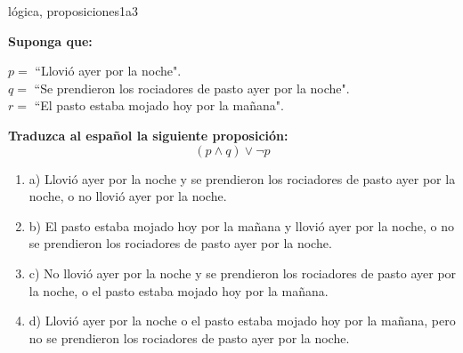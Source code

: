 \documentclass{article}
\begin{document}
\begin{question}{3}{lógica, proposiciones}{1}{a}{3}{
\textbf{Suponga que:} \medskip

\(p = \) ``Llovió ayer por la noche".\\
\(q = \) ``Se prendieron los rociadores de pasto ayer por la noche".\\
\(r = \) ``El pasto estaba mojado hoy por la mañana".\medskip

\textbf{Traduzca al español la siguiente proposición:}
\[
(p \land q) \lor \neg p
\]

\begin{enumerate}
   \item a) Llovió ayer por la noche y se prendieron los rociadores de pasto ayer por la noche, o no llovió ayer por la noche.
   \item b) El pasto estaba mojado hoy por la mañana y llovió ayer por la noche, o no se prendieron los rociadores de pasto ayer por la noche.
   \item c) No llovió ayer por la noche y se prendieron los rociadores de pasto ayer por la noche, o el pasto estaba mojado hoy por la mañana.
   \item d) Llovió ayer por la noche o el pasto estaba mojado hoy por la mañana, pero no se prendieron los rociadores de pasto ayer por la noche.
\end{enumerate}
}
\end{question}
\end{document}
